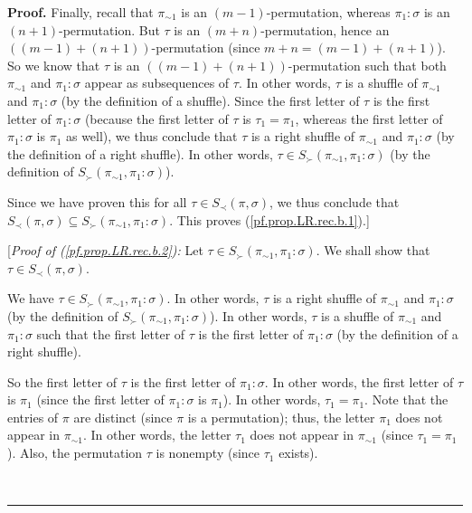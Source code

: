 \documentclass[numbers=enddot,12pt,final,onecolumn,notitlepage]{scrartcl}%
\theoremstyle{definition}
\newenvironment{proof}[1][Proof]{\noindent\textbf{#1.} }{\ \rule{0.5em}{0.5em}}
\begin{document}
\begin{proof}
Finally, recall that $\pi_{\sim1}$ is an $\left(  m-1\right)  $-permutation,
whereas $\pi_{1}:\sigma$ is an $\left(  n+1\right)  $-permutation. But $\tau$
is an $\left(  m+n\right)  $-permutation, hence an $\left(  \left(
m-1\right)  +\left(  n+1\right)  \right)  $-permutation (since $m+n=\left(
m-1\right)  +\left(  n+1\right)  $). So we know that $\tau$ is an
\newline$\left(  \left(  m-1\right)  +\left(  n+1\right)  \right)
$-permutation such that both $\pi_{\sim1}$ and $\pi_{1}:\sigma$ appear as
subsequences of $\tau$. In other words, $\tau$ is a shuffle of $\pi_{\sim1}$
and $\pi_{1}:\sigma$ (by the definition of a shuffle). Since the first letter
of $\tau$ is the first letter of $\pi_{1}:\sigma$ (because the first letter of
$\tau$ is $\tau_{1}=\pi_{1}$, whereas the first letter of $\pi_{1}:\sigma$ is
$\pi_{1}$ as well), we thus conclude that $\tau$ is a right shuffle of
$\pi_{\sim1}$ and $\pi_{1}:\sigma$ (by the definition of a right shuffle). In
other words, $\tau\in S_{\succ}\left(  \pi_{\sim1},\pi_{1}:\sigma\right)  $
(by the definition of $S_{\succ}\left(  \pi_{\sim1},\pi_{1}:\sigma\right)  $).

Since we have proven this for all $\tau\in S_{\prec}\left(  \pi,\sigma\right)
$, we thus conclude that $S_{\prec}\left(  \pi,\sigma\right)  \subseteq
S_{\succ}\left(  \pi_{\sim1},\pi_{1}:\sigma\right)  $. This proves
(\ref{pf.prop.LR.rec.b.1}).]

[\textit{Proof of (\ref{pf.prop.LR.rec.b.2}):} Let $\tau\in S_{\succ}\left(
\pi_{\sim1},\pi_{1}:\sigma\right)  $. We shall show that $\tau\in S_{\prec
}\left(  \pi,\sigma\right)  $.

We have $\tau\in S_{\succ}\left(  \pi_{\sim1},\pi_{1}:\sigma\right)  $. In
other words, $\tau$ is a right shuffle of $\pi_{\sim1}$ and $\pi_{1}:\sigma$
(by the definition of $S_{\succ}\left(  \pi_{\sim1},\pi_{1}:\sigma\right)  $).
In other words, $\tau$ is a shuffle of $\pi_{\sim1}$ and $\pi_{1}:\sigma$ such
that the first letter of $\tau$ is the first letter of $\pi_{1}:\sigma$ (by
the definition of a right shuffle).

So the first letter of $\tau$ is the first letter of $\pi_{1}:\sigma$. In
other words, the first letter of $\tau$ is $\pi_{1}$ (since the first letter
of $\pi_{1}:\sigma$ is $\pi_{1}$). In other words, $\tau_{1}=\pi_{1}$. Note
that the entries of $\pi$ are distinct (since $\pi$ is a permutation); thus,
the letter $\pi_{1}$ does not appear in $\pi_{\sim1}$. In other words, the
letter $\tau_{1}$ does not appear in $\pi_{\sim1}$ (since $\tau_{1}=\pi_{1}$).
Also, the permutation $\tau$ is nonempty (since $\tau_{1}$ exists).


\end{proof}
\end{document}
